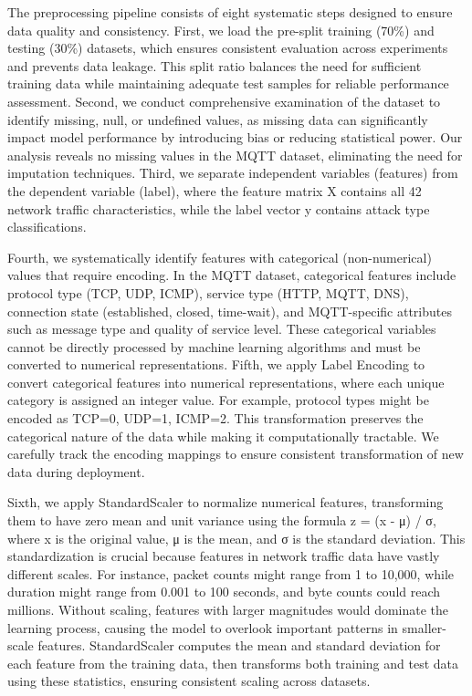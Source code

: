 \documentclass[conference]{IEEEtran}
\begin{document}
The preprocessing pipeline consists of eight systematic steps designed to ensure data quality and consistency. First, we load the pre-split training (70\%) and testing (30\%) datasets, which ensures consistent evaluation across experiments and prevents data leakage. This split ratio balances the need for sufficient training data while maintaining adequate test samples for reliable performance assessment. Second, we conduct comprehensive examination of the dataset to identify missing, null, or undefined values, as missing data can significantly impact model performance by introducing bias or reducing statistical power. Our analysis reveals no missing values in the MQTT dataset, eliminating the need for imputation techniques. Third, we separate independent variables (features) from the dependent variable (label), where the feature matrix X contains all 42 network traffic characteristics, while the label vector y contains attack type classifications.

Fourth, we systematically identify features with categorical (non-numerical) values that require encoding. In the MQTT dataset, categorical features include protocol type (TCP, UDP, ICMP), service type (HTTP, MQTT, DNS), connection state (established, closed, time-wait), and MQTT-specific attributes such as message type and quality of service level. These categorical variables cannot be directly processed by machine learning algorithms and must be converted to numerical representations. Fifth, we apply Label Encoding to convert categorical features into numerical representations, where each unique category is assigned an integer value. For example, protocol types might be encoded as TCP=0, UDP=1, ICMP=2. This transformation preserves the categorical nature of the data while making it computationally tractable. We carefully track the encoding mappings to ensure consistent transformation of new data during deployment.

Sixth, we apply StandardScaler to normalize numerical features, transforming them to have zero mean and unit variance using the formula z = (x - μ) / σ, where x is the original value, μ is the mean, and σ is the standard deviation. This standardization is crucial because features in network traffic data have vastly different scales. For instance, packet counts might range from 1 to 10,000, while duration might range from 0.001 to 100 seconds, and byte counts could reach millions. Without scaling, features with larger magnitudes would dominate the learning process, causing the model to overlook important patterns in smaller-scale features. StandardScaler computes the mean and standard deviation for each feature from the training data, then transforms both training and test data using these statistics, ensuring consistent scaling across datasets.
\end{document}
